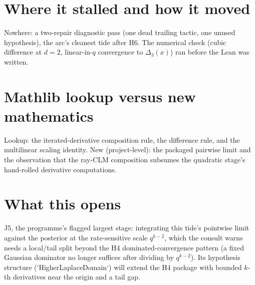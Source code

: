 \documentclass[11pt]{article}
\begin{document}
\section{Where it stalled and how it moved}

Nowhere: a two-repair diagnostic pass (one dead trailing tactic, one
unused hypothesis), the arc's cleanest tide after H6. The numerical
check (cubic difference at $d = 2$, linear-in-$q$ convergence to
$\Delta_3(x)$) ran before the Lean was written.

\section{Mathlib lookup versus new mathematics}

Lookup: the iterated-derivative composition rule, the difference
rule, and the multilinear scaling identity. New (project-level):
the packaged pairwise limit and the observation that the ray-CLM
composition subsumes the quadratic stage's hand-rolled derivative
computations.

\section{What this opens}

J5, the programme's flagged largest stage: integrating this tide's
pointwise limit against the posterior at the rate-sensitive scale
$q^{k-2}$, which the consult warns needs a local/tail split beyond
the H4 dominated-convergence pattern (a fixed Gaussian dominator no
longer suffices after dividing by $q^{k-2}$). Its hypothesis
structure (`HigherLaplaceDomain`) will extend the H4 package with
bounded $k$-th derivatives near the origin and a tail gap.
\end{document}
